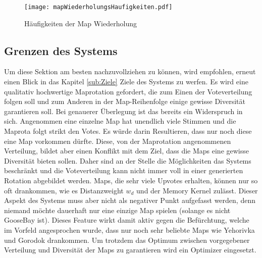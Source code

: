             \begin{figure}[htbp]
                \centering
                \texttt{[image: mapWiederholungsHaufigkeiten.pdf]}
                \caption{Häufigkeiten der Map Wiederholung}
                \label{fig:haufigkeit_der_map_wiederholung}
            \end{figure}

    \subsection{Grenzen des Systems}
        \label{s:grenzen_des_systems}
        Um diese Sektion am besten nachzuvollziehen zu können, wird empfohlen, erneut einen Blick in das Kapitel \ref{sub:Ziele} Ziele des Systems zu
        werfen. Es wird eine qualitativ hochwertige Maprotation gefordert, die zum Einen der Voteverteilung folgen soll und
        zum Anderen in der Map-Reihenfolge einige gewisse Diversität garantieren soll. Bei genauerer Überlegung ist
        das bereits ein Widerspruch in sich. Angenommen eine einzelne Map hat unendlich viele Stimmen und die Maprota 
        folgt strikt den Votes. Es würde darin Resultieren, dass nur noch diese eine Map vorkommen dürfte. Diese, von 
        der Maprotation angenommenen Verteilung, bildet aber einen Konflikt mit dem Ziel, dass die Maps eine gewisse Diversität
        bieten sollen. Daher sind an der Stelle die Möglichkeiten das Systems beschränkt und die Voteverteilung kann 
        nicht immer voll in einer generierten Rotation abgebildet werden. Maps, die sehr viele Upvotes erhalten, können nur so oft drankommen,
        wie es Distanzweight $w_d$ und der Memory Kernel zulässt. Dieser Aspekt des Systems muss aber nicht als negativer Punkt 
        aufgefasst werden, denn niemand möchte dauerhaft nur eine einzige Map spielen (solange es nicht GooseBay ist). 
        Dieses \glqq{}Feature\grqq{} wirkt damit aktiv gegen die Befürchtung, welche im Vorfeld angesprochen wurde,
        dass nur noch sehr beliebte Maps wie Yehorivka und Gorodok drankommen.
        Um trotzdem das Optimum zwischen vorgegebener Verteilung und Diversität der Maps zu garantieren wird ein Optimizer
        eingesetzt.\\
